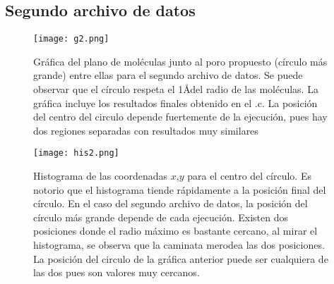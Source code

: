 \documentclass[notitlepage,letterpaper,12pt]{article} %
\begin{document}
\subsection{Segundo archivo de datos}


\begin{figure}[h]
  \centering
   \texttt{[image: g2.png]}
  \caption{Gráfica del plano de moléculas junto al poro propuesto (círculo más grande) entre ellas para el segundo archivo de datos. Se puede observar que el círculo respeta el 1\AA  del radio de las moléculas. La gráfica incluye los resultados finales obtenido en el .c. La posición del centro del circulo depende fuertemente de la ejecución, pues hay dos regiones separadas con resultados muy similares}
  \label{g1d1}
\end{figure}
\newpage

\begin{figure}[h]
  \centering
   \texttt{[image: his2.png]}
  \caption{Histograma de las coordenadas $x$,$y$ para el centro del círculo. Es notorio que el histograma tiende rápidamente a la posición final del círculo. En el caso del segundo archivo de datos, la posición del círculo más grande depende de cada ejecución. Existen dos posiciones donde el radio máximo es bastante cercano, al mirar el histograma, se observa que la caminata merodea las dos posiciones. La posición del circulo de la gráfica anterior puede ser cualquiera de las dos pues son valores muy cercanos. }
  \label{g2d1}
\end{figure}








\end{document}
